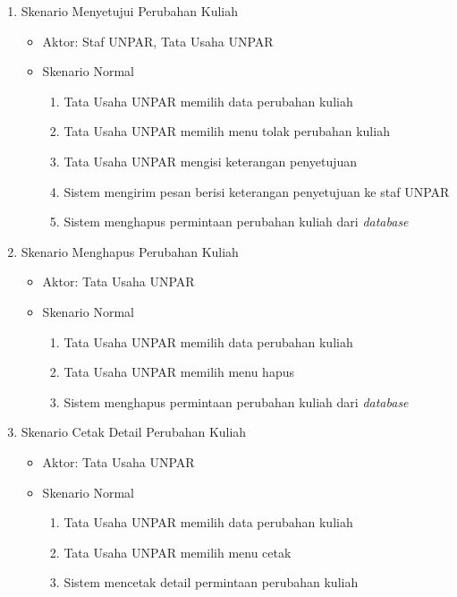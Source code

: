 \begin{enumerate}
	\item Skenario Menyetujui Perubahan Kuliah 
	\begin{itemize}
		\item Aktor: Staf UNPAR, Tata Usaha UNPAR
		\item Skenario Normal
			\begin{enumerate}[1.]
				\item Tata Usaha UNPAR memilih data perubahan kuliah 
				\item Tata Usaha UNPAR memilih menu tolak perubahan kuliah
				\item Tata Usaha UNPAR mengisi keterangan penyetujuan
				\item Sistem mengirim pesan berisi keterangan penyetujuan ke staf UNPAR
				\item Sistem menghapus permintaan perubahan kuliah dari \textit{database}
			\end{enumerate}
	\end{itemize}
	
	\item Skenario Menghapus Perubahan Kuliah 
	\begin{itemize}
		\item Aktor: Tata Usaha UNPAR
		\item Skenario Normal
			\begin{enumerate}[1.]
				\item Tata Usaha UNPAR memilih data perubahan kuliah 
				\item Tata Usaha UNPAR memilih menu hapus
				\item Sistem menghapus permintaan perubahan kuliah dari \textit{database}
			\end{enumerate}
	\end{itemize}

\item Skenario Cetak Detail Perubahan Kuliah 
	\begin{itemize}
		\item Aktor: Tata Usaha UNPAR
		\item Skenario Normal
			\begin{enumerate}[1.]
				\item Tata Usaha UNPAR memilih data perubahan kuliah 
				\item Tata Usaha UNPAR memilih menu cetak
				\item Sistem mencetak detail permintaan perubahan kuliah
			\end{enumerate}
	\end{itemize}


\end{enumerate}
